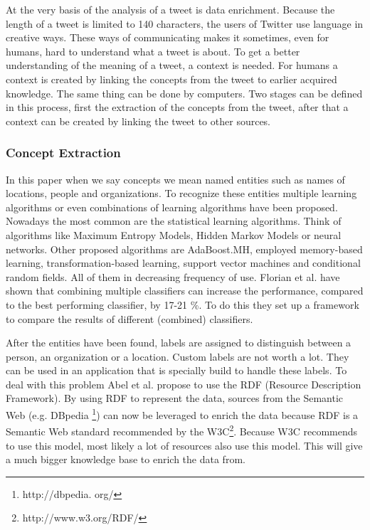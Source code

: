 \documentclass{article}
\begin{document}
At the very basis of the analysis of a tweet is data enrichment. Because the length of a tweet is limited to 140 characters, 
the users of Twitter use language in creative ways. These ways of communicating makes it sometimes, even for humans, hard to understand what a tweet is about. 
To get a better understanding of the meaning of a tweet, a context is needed. For humans a context is created by linking the concepts from the tweet to 
earlier acquired knowledge. The same thing can be done by computers. Two stages can be defined in this process, first the extraction of the concepts from 
the tweet, after that a context can be created by linking the tweet to other sources.

\subsubsection*{Concept Extraction}
In this paper when we say concepts we mean named entities such as names of locations, people and organizations. To recognize these entities multiple learning algorithms or even combinations of learning algorithms have been proposed. Nowadays the most common are the statistical learning algorithms. Think of algorithms like Maximum Entropy Models, Hidden Markov Models or neural networks. Other proposed algorithms are AdaBoost.MH, employed memory-based learning, transformation-based learning, support vector machines and conditional random fields. All of them in decreasing frequency of use.\cite{EntityRecognition} Florian et al. have shown that combining multiple classifiers can increase the performance, compared to the best performing classifier, by 17-21 \%.\cite{ClassifierCombination} To do this they set up a framework to compare the results of different (combined) classifiers.  

After the entities have been found, labels are assigned to distinguish between a person, an organization or a location. Custom labels are not worth a lot. They can be used in an application that is specially build to handle these labels. To deal with this problem Abel et al. propose to use the RDF (Resource Description Framework).\cite{AdaptiveSearch} By using RDF to represent the data, sources from the Semantic Web (e.g. DBpedia \footnote{http://dbpedia.
org/}) can now be leveraged to enrich the data because RDF is a Semantic Web standard recommended by the W3C\footnote{http://www.w3.org/RDF/}. Because W3C recommends to use this model, most likely a lot of resources also use this model. This will give a much bigger knowledge base to enrich the data from.
\end{document}
